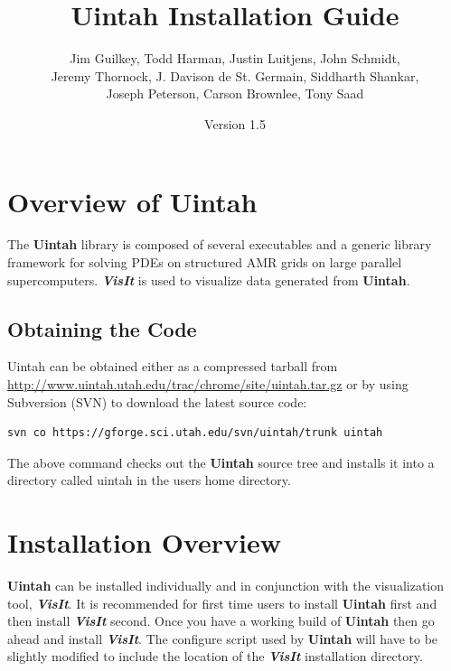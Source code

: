 \documentclass[12pt]{article}
\begin{document}
\title{Uintah Installation Guide}

\author{Jim Guilkey, Todd Harman, Justin Luitjens, John Schmidt,
  \\ Jeremy Thornock,
  J. Davison de St. Germain, Siddharth Shankar, \\
  Joseph Peterson,  
  Carson Brownlee,
  Tony Saad}

\date{Version 1.5}

\maketitle



\newpage

\tableofcontents

\newpage

\section{Overview of Uintah} \label{sec:overview} The \textbf{Uintah}
library is composed of several executables and a generic library
framework for solving PDEs on structured AMR grids on large parallel
supercomputers. \textbf{\emph{VisIt}} is used to visualize data
generated from \textbf{Uintah}.

\subsection{Obtaining the Code}
Uintah can be obtained either as a compressed tarball from
\url{http://www.uintah.utah.edu/trac/chrome/site/uintah.tar.gz} or by
using Subversion (SVN) to download the latest source code:

\begin{verbatim}
svn co https://gforge.sci.utah.edu/svn/uintah/trunk uintah
\end{verbatim}

The above command checks out the \textbf{Uintah} source tree and
installs it into a directory called uintah in the users home
directory.


\section{Installation Overview}

\textbf{Uintah} can be installed individually and in conjunction with
the visualization tool, \textbf{\emph{VisIt}}.  It is recommended for
first time users to install \textbf{Uintah} first and then install
\textbf{\emph{VisIt}} second. Once you have a working build of
\textbf{Uintah} then go ahead and install \textbf{\emph{VisIt}}.  The
configure script used by \textbf{Uintah} will have to be slightly
modified to include the location of the \textbf{\emph{VisIt}}
installation directory.  
\end{document}
